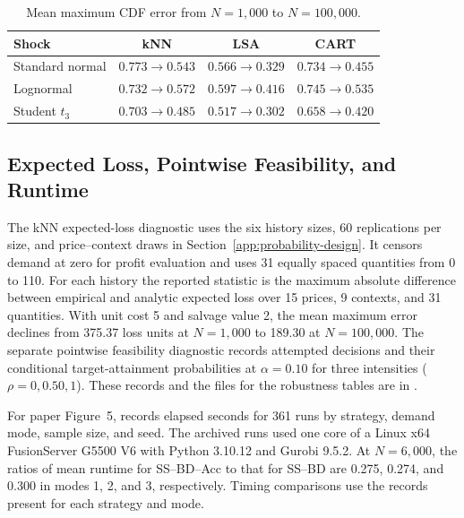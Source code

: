 \begin{table}[H]
\centering
\caption{Mean maximum CDF error from \(N=1{,}000\) to \(N=100{,}000\).}\label{tab:cdf-shock-robustness}
\begin{tabular}{lccc}
\toprule
Shock & kNN & LSA & CART \\
\midrule
Standard normal & \(0.773\to0.543\) & \(0.566\to0.329\) & \(0.734\to0.455\) \\
Lognormal & \(0.732\to0.572\) & \(0.597\to0.416\) & \(0.745\to0.535\) \\
Student \(t_3\) & \(0.703\to0.485\) & \(0.517\to0.302\) & \(0.658\to0.420\) \\
\bottomrule
\end{tabular}
\end{table}


\subsection{Expected Loss, Pointwise Feasibility, and Runtime}

The kNN expected-loss diagnostic uses the six history sizes, 60 replications per size, and price--context draws in Section~\ref{app:probability-design}. It censors demand at zero for profit evaluation and uses 31 equally spaced quantities from 0 to 110. For each history the reported statistic is the maximum absolute difference between empirical and analytic expected loss over 15 prices, 9 contexts, and 31 quantities. With unit cost 5 and salvage value 2, the mean maximum error declines from 375.37 loss units at \(N=1{,}000\) to 189.30 at \(N=100{,}000\). The separate pointwise feasibility diagnostic records attempted decisions and their conditional target-attainment probabilities at \(\alpha=0.10\) for three intensities (\(\rho=0,0.50,1\)). These records and the files for the robustness tables are in .

For paper Figure~5,  records elapsed seconds for 361 runs by strategy, demand mode, sample size, and seed. The archived runs used one core of a Linux x64 FusionServer G5500 V6 with Python 3.10.12 and Gurobi 9.5.2. At \(N=6{,}000\), the ratios of mean runtime for SS--BD--Acc to that for SS--BD are 0.275, 0.274, and 0.300 in modes 1, 2, and 3, respectively. Timing comparisons use the records present for each strategy and mode.
